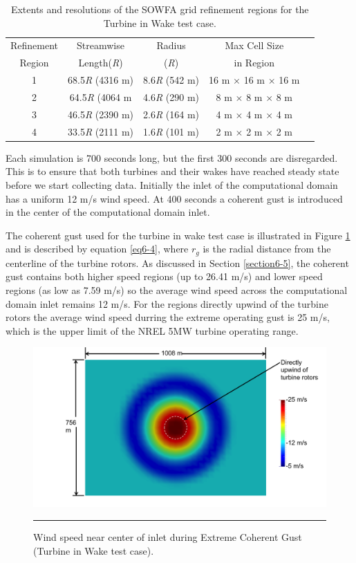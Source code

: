 \begin{table} \label{Table6-5}
\centering
\caption{ Extents and resolutions of the SOWFA grid refinement regions for the Turbine in Wake test case.}
\begin{tabular}{c c c c c}
\hline
Refinement & Streamwise       & Radius     & Max Cell Size\\
Region     & Length(\emph{R}) & (\emph{R}) &  in Region\\
\hline
1          & 68.5\emph{R} (4316 m)  & 8.6\emph{R} (542 m) & 16 m $\times$ 16 m $\times$ 16 m\\
2          & 64.5\emph{R} (4064 m   & 4.6\emph{R} (290 m) & 8 m $\times$ 8 m $\times$ 8 m\\
3          & 46.5\emph{R} (2390 m)  & 2.6\emph{R} (164 m) & 4 m $\times$ 4 m $\times$ 4 m\\
4          & 33.5\emph{R} (2111 m)  & 1.6\emph{R} (101 m) & 2 m $\times$ 2 m $\times$ 2 m\\
\hline
\end{tabular}
\end{table}

Each simulation is 700 seconds long, but the first 300 seconds are disregarded. This is to ensure that both turbines and their wakes have reached steady state before we start collecting data. Initially the inlet of the computational domain has a uniform 12 m/s wind speed. At 400 seconds a coherent gust is introduced in the center of the computational domain inlet. 

The coherent gust used for the turbine in wake test case is illustrated in Figure \ref{fig6-26} and is described by equation \ref{eq6-4}, where $r_g$ is the radial distance from the centerline of the turbine rotors. As discussed in Section \ref{section6-5}, the coherent gust contains both higher speed regions (up to 26.41 m/s) and lower speed regions (as low as 7.59 m/s) so the average wind speed across the computational domain inlet remains 12 m/s. For the regions directly upwind of the turbine rotors the average wind speed durring the extreme operating gust is 25 m/s, which is the upper limit of the NREL 5MW turbine operating range. 

\begin{figure}[htbp] \label{fig6-26} 
	\centering
		\includegraphics[width = \linewidth]{Figures/ch6Figures/fig6-26.png}
		\rule{35em}{0.5pt}
	\caption{Wind speed near center of inlet during Extreme Coherent Gust (Turbine in Wake test case).}
\end{figure}

